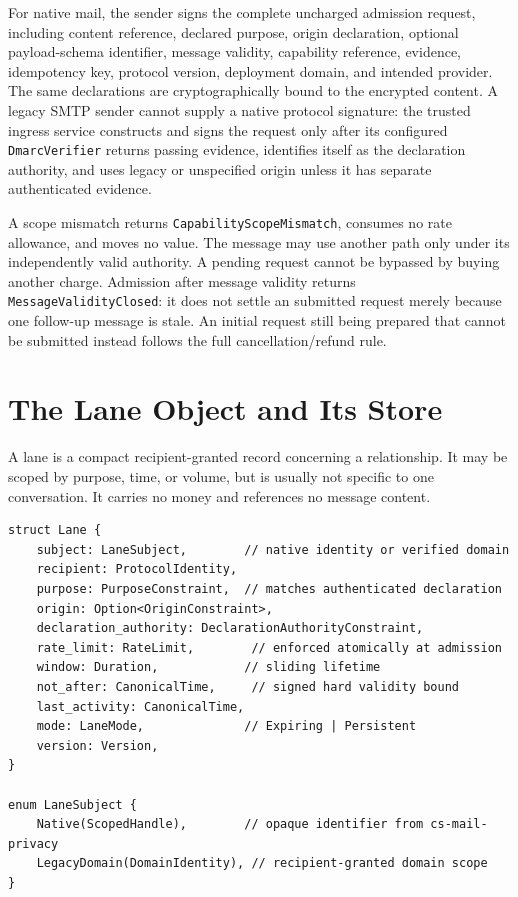 \documentclass[11pt]{article}
\begin{document}
For native mail, the sender signs the complete uncharged admission request,
including content reference, declared purpose, origin declaration, optional
payload-schema identifier, message validity, capability reference, evidence,
idempotency key, protocol version, deployment domain, and intended provider. The
same declarations are cryptographically bound to the encrypted content. A legacy
SMTP sender cannot supply a native protocol signature: the trusted ingress service
constructs and signs the request only after its configured \texttt{DmarcVerifier}
returns passing evidence, identifies itself as the declaration authority, and uses
legacy or unspecified origin unless it has separate authenticated evidence.

A scope mismatch returns \texttt{CapabilityScopeMismatch}, consumes no rate
allowance, and moves no value. The message may use another path only under its independently valid authority.
A pending request cannot be bypassed by buying another charge. Admission after
message validity returns \texttt{MessageValidityClosed}: it does not settle an
submitted request merely because one follow-up message is stale. An initial
request still being prepared that cannot be submitted instead follows the full cancellation/refund rule.

\section{The Lane Object and Its Store}

A lane is a compact recipient-granted record concerning a relationship. It may
be scoped by purpose, time, or volume, but is usually not specific to one
conversation. It carries no money and references no message content.

\begin{verbatim}
struct Lane {
    subject: LaneSubject,        // native identity or verified domain
    recipient: ProtocolIdentity,
    purpose: PurposeConstraint,  // matches authenticated declaration
    origin: Option<OriginConstraint>,
    declaration_authority: DeclarationAuthorityConstraint,
    rate_limit: RateLimit,        // enforced atomically at admission
    window: Duration,            // sliding lifetime
    not_after: CanonicalTime,     // signed hard validity bound
    last_activity: CanonicalTime,
    mode: LaneMode,              // Expiring | Persistent
    version: Version,
}

enum LaneSubject {
    Native(ScopedHandle),        // opaque identifier from cs-mail-privacy
    LegacyDomain(DomainIdentity), // recipient-granted domain scope
}
\end{verbatim}
\end{document}
